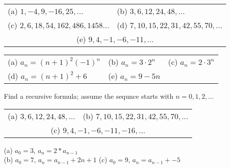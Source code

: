 \begin{questions}
\begin{tabular}{ll}
    (a) $1, -4, 9, -16, 25, \ldots$ 
        & (b) $3, 6, 12, 24, 48, \ldots$ \\
    (c) $2, 6, 18, 54, 162, 486, 1458\ldots$  \hspace{0.3in}
        & (d) $7, 10, 15, 22, 31, 42, 55, 70, \ldots$ \\
    \multicolumn{2}{c}{(e) $9, 4, -1, -6, -11, \ldots$ }
\end{tabular}
    \ifprintanswers
        \vspace{-10pt}
   \fi
\begin{solution}
    
    \begin{tabular}{lll}
        (a) $a_n = (n+1)^2 (-1)^n$ \hspace{0.6in}
            & (b) $a_n = 3\cdot 2^n$ \hspace{0.6in}
            & (c) $a_n = 2\cdot 3^n$ \\
        (d) $a_n = (n+1)^2 + 6$
            & (e) $a_n = 9 - 5n$
    \end{tabular}
\end{solution}



 Find a recursive formula; assume the sequnce starts with $n=0,1,2,\ldots$

\begin{tabular}{ll}
    (a) $3, 6, 12, 24, 48, \ldots$  \hspace{0.3in}
        & (b) $7, 10, 15, 22, 31, 42, 55, 70, \ldots$\\
    \multicolumn{2}{c}{(c) $9, 4, -1, -6, -11, -16, \ldots$}
\end{tabular}
    \ifprintanswers
        \vspace{-10pt}
   \fi
\begin{solution}
    (a) $a_0 = 3$, $a_n = 2*a_{n-1}$ \\
    (b)  $a_0 = 7$, $a_n = a_{n-1} + 2n + 1$  
        \hspace{0.6in} (c) $a_0 = 9$, $a_n = a_{n-1} + -5$
\end{solution}





\end{questions}
